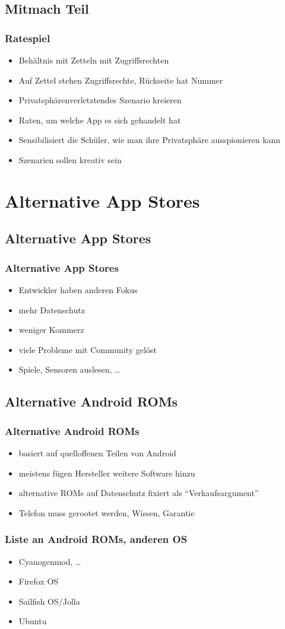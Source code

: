 \documentclass[12pt]{beamer}
\begin{document}
\subsection{Mitmach Teil}
\begin{frame}
	\frametitle{Ratespiel}
	\begin{itemize}
		\item<2-> Behältnis mit Zetteln mit Zugriffsrechten
		\item<3-> Auf Zettel stehen Zugriffsrechte, Rückseite hat Nummer
		\item<4-> Privatsphärenverletztendes Szenario kreieren
		\item<5-> Raten, um welche App es sich gehandelt hat
		\item<6-> Sensibilisiert die Schüler, wie man ihre Privatsphäre ausspionieren kann
		\item<7-> Szenarien sollen kreativ sein
	\end{itemize}
\end{frame}

\section{Alternative App Stores}
\subsection{Alternative App Stores}
\begin{frame}
	\frametitle{Alternative App Stores}
	\begin{itemize}
		\item<2-> Entwickler haben anderen Fokus
		\item<3-> mehr Datenschutz
		\item<4-> weniger Kommerz
		\item<5-> viele Probleme mit Community gelöst
		\item<6-> Spiele, Sensoren auslesen, \ldots
	\end{itemize}
\end{frame}
\subsection{Alternative Android ROMs}
\begin{frame}
	\frametitle{Alternative Android ROMs}
	\begin{itemize}
		\item<2-> basiert auf quelloffenen Teilen von Android
		\item<3-> meistens fügen Hersteller weitere Software hinzu
		\item<4-> alternative ROMs auf Datenschutz fixiert als "`Verkaufsargument"'
		\item<5-> Telefon muss gerootet werden, Wissen, Garantie
	\end{itemize}
\end{frame}

\begin{frame}
	\frametitle{Liste an Android ROMs, anderen OS}
	\begin{itemize}
		\item<2-> Cyanogenmod, \ldots
		\item<3-> Firefox OS
		\item<4-> Sailfish OS/Jolla
		\item<5-> Ubuntu
	\end{itemize}
\end{frame}
\end{document}
